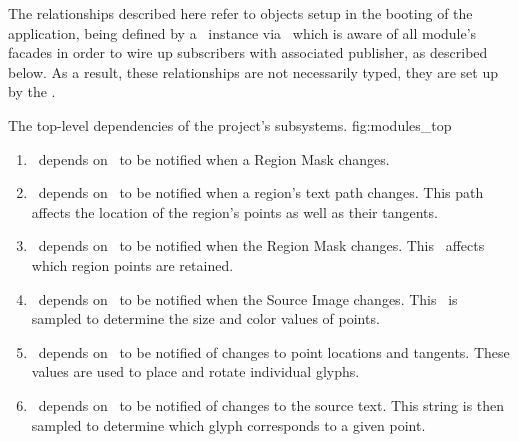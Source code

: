 The relationships described here refer to objects setup in the booting of the application, being defined by a \sysfact\ instance via \sysbldr\ which is aware of all module's facades in order to wire up subscribers with associated publisher, as described below.
As a result, these relationships are not necessarily typed, they are set up by the \sysfact.

{The top-level dependencies of the project's subsystems.}
{fig:modules_top}
{\diagsize}

\begin{enumerate}
  \item \linemod\ depends on \regmod\ to be notified when a Region Mask changes.
  \item \ptmod\ depends on \linemod\ to be notified when a region's text path changes.  This path affects the location of the region's points as well as their tangents.
  \item \ptmod\ depends on \regmod\ to be notified when the Region Mask changes.  This \bmtype\ affects which region points are retained.
  \item \ptmod\ depends on \srcmod\ to be notified when the Source Image changes.  This \bmtype\ is sampled to determine the size and color values of points.
  \item \glymod\ depends on \ptmod\ to be notified of changes to point locations and tangents.  These values are used to place and rotate individual glyphs.
  \item \glymod\ depends on \srcmod\ to be notified of changes to the source text.  This string is then sampled to determine which glyph corresponds to a given point.
\end{enumerate}

